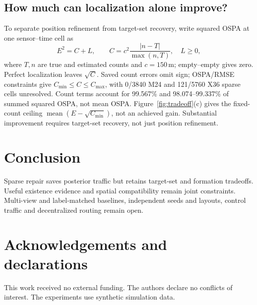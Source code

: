 \documentclass{article}
\begin{document}
\subsection{How much can localization alone improve?}
To separate position refinement from target-set recovery, write squared
OSPA at one sensor--time cell as
\begin{equation}
 E^2=C+L,\qquad C=c^2\frac{|n-T|}{\max(n,T)},\quad L\geq0,
 \label{eq:countbudget}
\end{equation}
where $T,n$ are true and estimated counts and $c=150$\,m; empty--empty gives
zero. Perfect localization leaves $\sqrt C$. Saved count errors omit sign;
OSPA/RMSE constraints give $C_{\min}\leq C\leq C_{\max}$, with 0/3840 M24
and 121/5760 X36 sparse cells unresolved. Count terms account for 99.567\%
and 98.074--99.337\% of summed squared OSPA, not mean OSPA.
Figure~\ref{fig:tradeoff}(c) gives the fixed-count ceiling
$\operatorname{mean}(E-\sqrt{C_{\min}})$, not an achieved gain. Substantial
improvement requires target-set recovery, not just position refinement.

\section{Conclusion}
Sparse repair saves posterior traffic but retains target-set and formation
tradeoffs. Useful existence evidence and spatial compatibility remain joint
constraints. Multi-view and label-matched baselines, independent seeds and
layouts, control traffic and decentralized routing remain open.

\section*{Acknowledgements and declarations}
This work received no external funding. The authors declare no conflicts
of interest. The experiments use synthetic simulation data.


\end{document}

